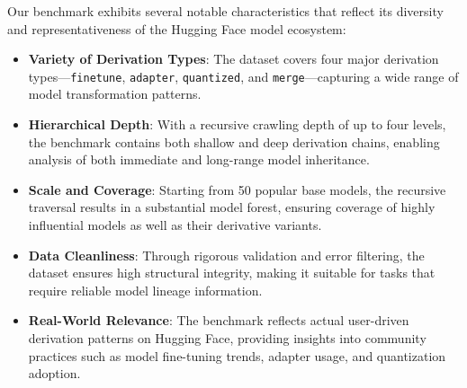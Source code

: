 Our benchmark exhibits several notable characteristics that reflect its diversity and representativeness of the Hugging Face model ecosystem:

\begin{itemize}
    \item \textbf{Variety of Derivation Types}: The dataset covers four major derivation types—\texttt{finetune}, \texttt{adapter}, \texttt{quantized}, and \texttt{merge}—capturing a wide range of model transformation patterns.
    
    \item \textbf{Hierarchical Depth}: With a recursive crawling depth of up to four levels, the benchmark contains both shallow and deep derivation chains, enabling analysis of both immediate and long-range model inheritance.
    
    \item \textbf{Scale and Coverage}: Starting from 50 popular base models, the recursive traversal results in a substantial model forest, ensuring coverage of highly influential models as well as their derivative variants.
    
    \item \textbf{Data Cleanliness}: Through rigorous validation and error filtering, the dataset ensures high structural integrity, making it suitable for tasks that require reliable model lineage information.
    
    \item \textbf{Real-World Relevance}: The benchmark reflects actual user-driven derivation patterns on Hugging Face, providing insights into community practices such as model fine-tuning trends, adapter usage, and quantization adoption.
\end{itemize}
